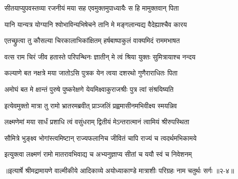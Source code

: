 \twolineshloka
{सीतयाप्युपवस्तव्या रजनीयं मया सह}
{एवमुक्तमुपाध्यायैः स हि मामुक्तवान् पिता} %

\twolineshloka
{यानि यान्यत्र योग्यानि श्वोभाविन्यभिषेचने}
{तानि मे मङ्गलान्यद्य वैदेह्याश्चैव कारय} %

\twolineshloka
{एतच्छ्रुत्वा तु कौसल्या चिरकालाभिकांक्षितम्}
{हर्षबाष्पाकुलं वाक्यमिदं राममभाषत} %

\twolineshloka
{वत्स राम चिरं जीव हतास्ते परिपन्थिनः}
{ज्ञातीन् मे त्वं श्रिया युक्तः सुमित्रायाश्च नन्दय} %

\twolineshloka
{कल्याणे बत नक्षत्रे मया जातोऽसि पुत्रक}
{येन त्वया दशरथो गुणैराराधितः पिता} %

\twolineshloka
{अमोघं बत मे क्षान्तं पुरुषे पुष्करेक्षणे}
{येयमिक्ष्वाकुराजश्रीः पुत्र त्वां संश्रयिष्यति} %

\twolineshloka
{इत्येवमुक्तो मात्रा तु रामो भ्रातरमब्रवीत्}
{प्राञ्जलिं प्रह्वमासीनमभिवीक्ष्य स्मयन्निव} %

\twolineshloka
{लक्ष्मणेमां मया सार्धं प्रशाधि त्वं वसुंधराम्}
{द्वितीयं मेऽन्तरात्मानं त्वामियं श्रीरुपस्थिता} %

\twolineshloka
{सौमित्रे भुङ्क्ष्व भोगांस्त्वमिष्टान् राज्यफलानिच}
{जीवितं चापि राज्यं च त्वदर्थमभिकामये} %

\twolineshloka
{इत्युक्त्वा लक्ष्मणं रामो मातरावभिवाद्य च}
{अभ्यनुज्ञाप्य सीतां च ययौ स्वं च निवेशनम्} %


॥इत्यार्षे श्रीमद्रामायणे वाल्मीकीये आदिकाव्ये अयोध्याकाण्डे मात्राशीः परिग्रहः नाम चतुर्थः सर्गः ॥२-४॥
